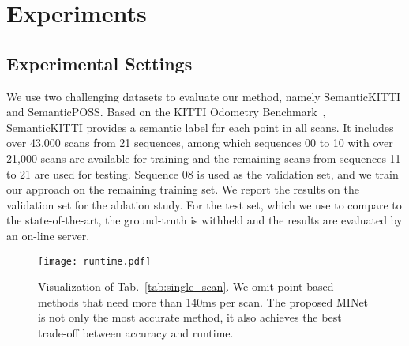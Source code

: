 \documentclass[letterpaper, 10 pt, journal, twoside]{ieeetran}
\newcommand{\tabref}[1]{Tab.~\ref{#1}}
\begin{document}
\section{Experiments}

\subsection{Experimental Settings}
We use two challenging datasets to evaluate our method, namely SemanticKITTI \cite{behley2019semantickitti,SemKITTI} and SemanticPOSS\cite{pan2020semanticposs}.
Based on the KITTI Odometry Benchmark~\cite{geiger2012we}, SemanticKITTI provides a semantic label for each point in all scans.
It includes over 43,000 scans from 21 sequences, among which sequences 00 to 10 with over 21,000 scans are available for training and the remaining scans from sequences 11 to 21 are used for testing.
Sequence 08 is used as the validation set, and we train our approach on the remaining training set. We report the results on the validation set for the ablation study. For the test set, which we use to compare to the state-of-the-art, the ground-truth is withheld and the results are evaluated by an on-line server.


\begin{figure}[!t]
    \centering
    \texttt{[image: runtime.pdf]}
    \caption{Visualization of \tabref{tab:single_scan}.
    We omit point-based methods that need more than 140ms per scan.
    The proposed MINet is not only the most accurate method,
    it also achieves the best trade-off between accuracy and runtime.}
    \label{fig:runtime}
    \vspace{-6mm}
\end{figure}
\end{document}
